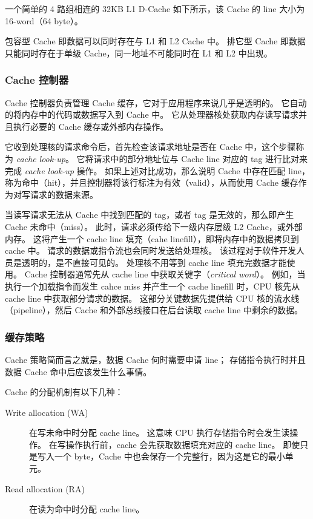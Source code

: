 一个简单的 4 路组相连的 32KB L1 D-Cache 如下所示，该 Cache 的 line 大小为 16-word（64 byte）。



包容型 Cache 即数据可以同时存在与 L1 和 L2 Cache 中。
排它型 Cache 即数据只能同时存在于单级 Cache，同一地址不可能同时在 L1 和 L2 中出现。

\subsubsection{Cache 控制器}

Cache 控制器负责管理 Cache 缓存，它对于应用程序来说几乎是透明的。
它自动的将内存中的代码或数据写入到 Cache 中。
它从处理器核处获取内存读写请求并且执行必要的 Cache 缓存或外部内存操作。

它收到处理核的请求命令后，首先检查该请求地址是否在 Cache 中，这个步骤称为 \textit{cache look-up}。
它将请求中的部分地址位与 Cache line 对应的 tag 进行比对来完成 \textit{cache look-up} 操作。
如果上述对比成功，那么说明 Cache 中存在匹配 line，称为命中（hit），并且控制器将该行标注为有效（valid），从而使用 Cache 缓存作为对写请求的数据来源。

当读写请求无法从 Cache 中找到匹配的 tag，或者 tag 是无效的，那么即产生 Cache 未命中（miss）。
此时，请求必须传给下一级内存层级 L2 Cache，或外部内存。
这将产生一个 cache line 填充（cahe linefill），即将内存中的数据拷贝到 cache 中。
请求的数据或指令流也会同时发送给处理核。
该过程对于软件开发人员是透明的，是不直接可见的。
处理核不用等到 cache line 填充完数据才能使用。
Cache 控制器通常先从 cache line 中获取关键字（\textit{critical word}）。
例如，当执行一个加载指令而发生 cahce miss 并产生一个 cache linefill 时，CPU 核先从 cache line 中获取部分请求的数据。
这部分关键数据先提供给 CPU 核的流水线（pipeline），然后 Cache 和外部总线接口在后台读取 cache line 中剩余的数据。

\subsubsection{缓存策略}

Cache 策略简而言之就是，数据 Cache 何时需要申请 line；
存储指令执行时并且数据 Cache 命中后应该发生什么事情。

Cache 的分配机制有以下几种：

\begin{description}
  \item[Write allocation (WA)] 在写未命中时分配 cache line。
    这意味 CPU 执行存储指令时会发生读操作。
    在写操作执行前，cache 会先获取数据填充对应的 cache line。
    即使只是写入一个 byte，Cache 中也会保存一个完整行，因为这是它的最小单元。
  
  \item[Read allocation (RA)] 在读为命中时分配 cache line。
\end{description}


